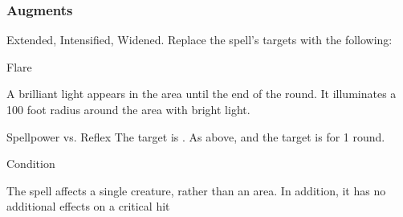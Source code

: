 \subsubsection{Augments}
 Extended, Intensified, Widened.
Replace
the spell's targets with the following:
\begin{augmenttargetinginfo}
\end{augmenttargetinginfo}
\begin{spellsection}{Flare}
\begin{spellcontent}
\begin{spelltargetinginfo}
\end{spelltargetinginfo}
\begin{spelleffects}
\spelleffect
A brilliant light appears in the area until the end of the round.
It illuminates a 100 foot radius around the area with bright light.
\begin{spellattack}{Spellpower vs. Reflex}
\spellsuccess
The target is \partiallyblinded.
\spellcritical
As above, and the target is \blinded for 1 round.
\end{spellattack}
\spelldur Condition
\end{spelleffects}
\end{spellcontent}
\begin{spellfooter}
\miscastexplode
\end{spellfooter}
\begin{spellcantrip}
The spell affects a single creature, rather than an area. In addition, it has no additional effects on a critical hit
\end{spellcantrip}
\end{spellsection}
